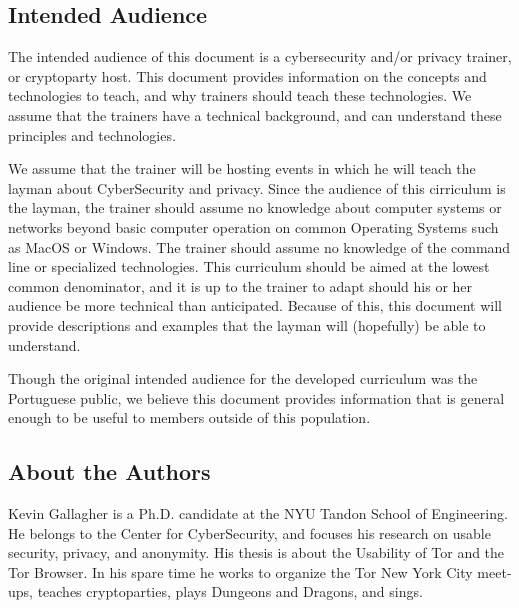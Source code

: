 \subsection{Intended Audience}

The intended audience of this document is a cybersecurity and/or privacy trainer, or cryptoparty host. This document provides information on the concepts and technologies to teach, and why trainers should teach these technologies. We assume that the trainers have a technical background, and can understand these principles and technologies.

We assume that the trainer will be hosting events in which he will teach the layman about CyberSecurity and privacy. Since the audience of this cirriculum is the layman, the trainer should assume no knowledge about computer systems or networks beyond basic computer operation on common Operating Systems such as MacOS or Windows. The trainer should assume no knowledge of the command line or specialized technologies. This curriculum should be aimed at the lowest common denominator, and it is up to the trainer to adapt should his or her audience be more technical than anticipated. Because of this, this document will provide descriptions and examples that the layman will (hopefully) be able to understand.

Though the original intended audience for the developed curriculum was the Portuguese public, we believe this document provides information that is general enough to be useful to members outside of this population.

\subsection{About the Authors}

Kevin Gallagher is a Ph.D. candidate at the NYU Tandon School of Engineering. He belongs to the Center for CyberSecurity, and focuses his research on usable security, privacy, and anonymity. His thesis is about the Usability of Tor and the Tor Browser. In his spare time he works to organize the Tor New York City meet-ups, teaches cryptoparties, plays Dungeons and Dragons, and sings.
